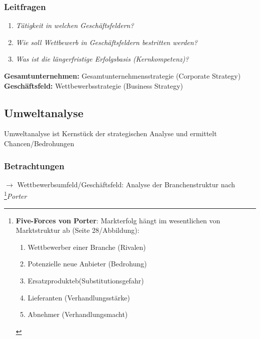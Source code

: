 \documentclass[a4paper,11pt, twoside]{article}
\begin{document}
\subsubsection*{Leitfragen}
\begin{enumerate}
	\item \textit{Tätigkeit in welchen Geschäftsfeldern?}
	\item \textit{Wie soll Wettbewerb in Geschäftsfeldern bestritten werden?}
	\item \textit{Was ist die längerfristige Erfolgsbasis (Kernkompetenz)?}
\end{enumerate}

\textbf{Gesamtunternehmen:} Gesamtunternehmensstrategie (Corporate Strategy)\\
\textbf{Geschäftsfeld:} Wettbewerbsstrategie (Business Strategy)

\subsection{Umweltanalyse}

Umweltanalyse ist Kernstück der strategischen Analyse und ermittelt Chancen/Bedrohungen

\subsubsection*{Betrachtungen}
$\rightarrow$ Wettbewerbsumfeld/Geschäftsfeld: Analyse der Branchenstruktur nach \footnote{
\textbf{Five-Forces von Porter}: Markterfolg hängt im wesentlichen von Marktstruktur ab (Seite 28/Abbildung):
\begin{enumerate}
	\item Wettbewerber einer Branche (Rivalen)
	\item Potenzielle neue Anbieter (Bedrohung)
	\item Ersatzprodukteb(Substitutionsgefahr)
	\item Lieferanten (Verhandlungsstärke)
	\item Abnehmer (Verhandlungsmacht)
\end{enumerate}
}{\textit{Porter}}
\end{document}
